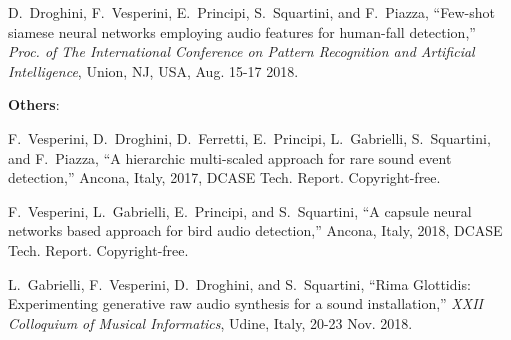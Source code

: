 \begin{list}{[]~}{}
\item
D.~Droghini, F.~Vesperini, E.~Principi, S.~Squartini, and F.~Piazza, ``Few-shot siamese neural networks employing audio features for human-fall detection,'' \emph{Proc. of The International Conference on Pattern Recognition and Artificial Intelligence}, Union, NJ, USA, Aug. 15-17 2018.

  
\end{list}

\textbf{Others}:
\begin{list}{[]~}{}
\item
F.~Vesperini, D.~Droghini, D.~Ferretti, E.~Principi, L.~Gabrielli, S.~Squartini, and F.~Piazza, ``A hierarchic multi-scaled approach for rare sound event detection,'' Ancona, Italy, 2017, {DCASE} {T}ech. {R}eport. {C}opyright-free.

\item 
F.~Vesperini, L.~Gabrielli, E.~Principi, and S.~Squartini, ``A capsule neural networks based approach for bird audio detection,'' Ancona, Italy, 2018, {DCASE} {T}ech. {R}eport. {C}opyright-free.

\item
L.~Gabrielli, F.~Vesperini, D.~Droghini, and S.~Squartini, ``Rima {G}lottidis: Experimenting generative raw audio synthesis for a sound installation,'' \emph{XXII Colloquium of Musical Informatics}, Udine, Italy, 20-23 Nov. 2018.

\end{list}
	



